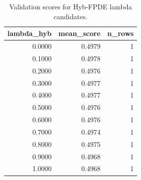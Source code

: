 \begin{table}[t]
\caption{Validation scores for Hyb-FPDE lambda candidates.}
\label{tab:lambda_distribution_computed}
\centering
\begin{tabular}{rrr}
\toprule
lambda\_hyb & mean\_score & n\_rows \\
\midrule
0.0000 & 0.4979 & 1 \\
0.1000 & 0.4978 & 1 \\
0.2000 & 0.4976 & 1 \\
0.3000 & 0.4977 & 1 \\
0.4000 & 0.4977 & 1 \\
0.5000 & 0.4976 & 1 \\
0.6000 & 0.4976 & 1 \\
0.7000 & 0.4974 & 1 \\
0.8000 & 0.4975 & 1 \\
0.9000 & 0.4968 & 1 \\
1.0000 & 0.4968 & 1 \\
\bottomrule
\end{tabular}

\end{table}
